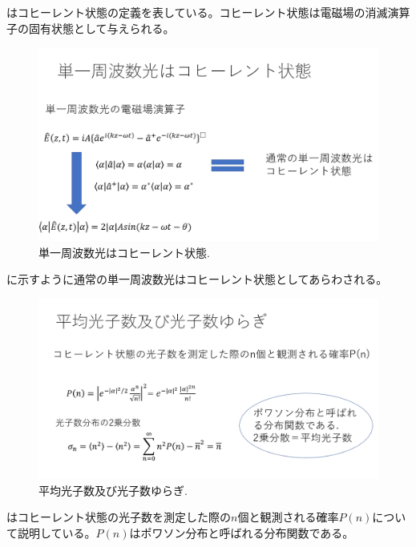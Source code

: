     はコヒーレント状態の定義を表している。コヒーレント状態は電磁場の消滅演算子の固有状態として与えられる。
    
\begin{figure}[htbp]
        \centering   
        \includegraphics[width=1.0\textwidth]{img/zemi10.png}
        \caption[sample image (png)]{単一周波数光はコヒーレント状態.}
        \label{Fig:1_5_2}
    \end{figure}
    
    に示すように通常の単一周波数光はコヒーレント状態としてあらわされる。

\begin{figure}[htbp]
        \centering   
        \includegraphics[width=1.0\textwidth]{img/zemi11.png}
        \caption[sample image (png)]{平均光子数及び光子数ゆらぎ.}
        \label{Fig:1_5_3}
    \end{figure}
    
    はコヒーレント状態の光子数を測定した際の$n$個と観測される確率$P(n)$について説明している。$P(n)$はポワソン分布と呼ばれる分布関数である。

